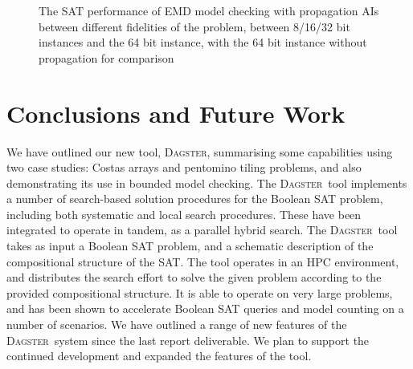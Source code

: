 \documentclass[10pt,a4paper,oneside,headinclude,footinclude,BCOR5mm]{scrartcl}
\newcommand{\dagster}{\textsc{Dagster}\xspace}
\begin{document}
\begin{figure}
\caption[EMD model checking performance graph]{The SAT performance of EMD model checking with propagation AIs between different fidelities of the problem, between 8/16/32 bit instances and the 64 bit instance, with the 64 bit instance without propagation for comparison}\label{fig:performance_EMD}
\end{figure}


\section{Conclusions and Future Work}


We have outlined our new tool, \dagster, summarising some capabilities using two case studies: Costas arrays and pentomino tiling problems, and also demonstrating its use in bounded model checking.
The \dagster\ tool implements a number of search-based solution procedures for the Boolean SAT problem, including both systematic and local search procedures.
These have been integrated to operate in tandem, as a parallel hybrid search.
The \dagster\ tool takes as input a Boolean SAT problem, and a schematic description of the compositional structure of the SAT.
The tool operates in an HPC environment, and  distributes the search effort to solve the given problem according to the provided compositional structure.
It is able to operate on very large problems, and has been shown to accelerate Boolean SAT queries and model counting on a number of scenarios.
We have outlined a range of new features of the \dagster\ system since the last report deliverable.
We plan to support the continued development and expanded the features of the tool.

\FloatBarrier

\pagebreak
\renewcommand{\refname}{\spacedlowsmallcaps{References}} %

\end{document}
